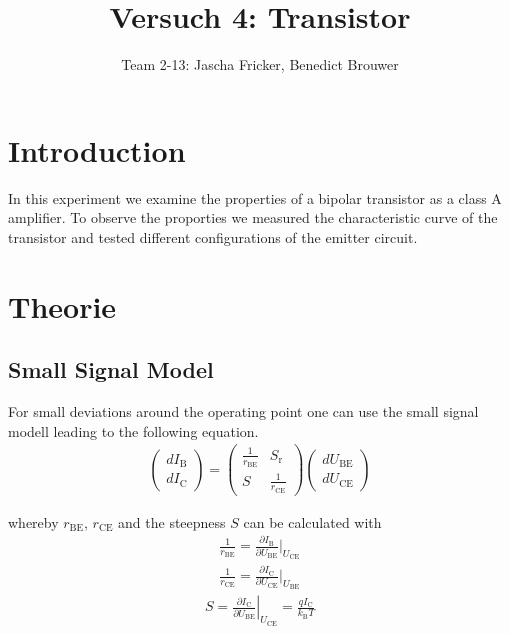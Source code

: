 \documentclass[11pt, a4paper]{article}
\title{Versuch 4: Transistor}
\author{Team 2-13: Jascha Fricker, Benedict Brouwer}
\begin{document}
    \maketitle

    \tableofcontents

    \newpage
\section{Introduction}
In this experiment we examine the properties of a bipolar transistor as a class A amplifier. To observe the proporties we measured the characteristic curve 
of the transistor and tested different configurations of the emitter circuit.
\section{Theorie}

\FloatBarrier
\subsection{Small Signal Model}
For small deviations around the operating point one can use the small signal modell leading to the following equation.
\begin{align}
\left(\begin{array}{l}
    d I_{\mathrm{B}} \\
    d I_{\mathrm{C}}
    \end{array}\right)=\left(\begin{array}{cc}
    \frac{1}{r_{\mathrm{BE}}} & S_{\mathrm{r}} \\
    S & \frac{1}{r_{\mathrm{CE}}}
    \end{array}\right)\left(\begin{array}{l}
    d U_{\mathrm{BE}} \\
    d U_{\mathrm{CE}}
    \end{array}\right)
    \label{eq:ssm}
\end{align}

whereby $r_{\text{BE}}$, $r_{\text{CE}}$ and the steepness $S$ can be calculated with
\begin{align}
    \frac{1}{r_{\text{BE}}} = \frac{\partial I_{\text{B}}}{\partial U_{\text{BE}}} |_{U_{\text{CE}}} \label{eq:rbe} 
\end{align}
\begin{align}
    \frac{1}{r_{\text{CE}}} = \frac{\partial I_{\text{C}}}{\partial U_{\text{CE}}} |_{U_{\text{BE}}} \label{eq:rce} 
\end{align}
\begin{align}
    S=\left .\frac{\partial I_{\mathrm{C}}}{\partial U_{\mathrm{BE}}}\right |_{U_{\mathrm{CE}}}=\frac{q I_{\mathrm{C}}}{k_{\mathrm{B}} T} \label{eq:steep}
\end{align}
\end{document}
